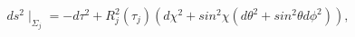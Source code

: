 \begin{equation}
\label{boundary} ds^2\mid_{\Sigma_{j}}=-d\tau^2+R_{j}^2(\tau_{j})
\left(d\chi^2+sin^2 \chi(d \theta^2+ sin^2 \theta d
\phi^2)\right),
\end{equation}

